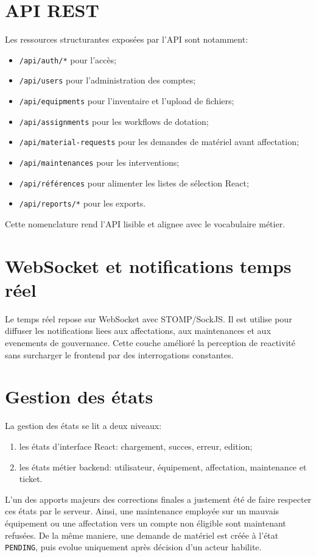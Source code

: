 ﻿\documentclass[12pt,a4paper,oneside]{report}
\begin{document}
\section{API REST}
Les ressources structurantes exposées par l'API sont notamment:
\begin{itemize}
  \item \texttt{/api/auth/*} pour l'accès;
  \item \texttt{/api/users} pour l'administration des comptes;
  \item \texttt{/api/equipments} pour l'inventaire et l'upload de fichiers;
  \item \texttt{/api/assignments} pour les workflows de dotation;
  \item \texttt{/api/material-requests} pour les demandes de matériel avant affectation;
  \item \texttt{/api/maintenances} pour les interventions;
  \item \texttt{/api/références} pour alimenter les listes de sélection React;
  \item \texttt{/api/reports/*} pour les exports.
\end{itemize}

Cette nomenclature rend l'API lisible et alignee avec le vocabulaire métier.

\section{WebSocket et notifications temps réel}
Le temps réel repose sur WebSocket avec STOMP/SockJS. Il est utilise pour diffuser les notifications liees aux affectations, aux maintenances et aux evenements de gouvernance. Cette couche amélioré la perception de reactivité sans surcharger le frontend par des interrogations constantes.

\section{Gestion des états}
La gestion des états se lit a deux niveaux:
\begin{enumerate}
  \item les états d'interface React: chargement, succes, erreur, edition;
  \item les états métier backend: utilisateur, équipement, affectation, maintenance et ticket.
\end{enumerate}

L'un des apports majeurs des corrections finales a justement été de faire respecter ces états par le serveur. Ainsi, une maintenance employée sur un mauvais équipement ou une affectation vers un compte non éligible sont maintenant refusées. De la même maniere, une demande de matériel est créée à l'état \texttt{PENDING}, puis evolue uniquement après décision d'un acteur habilite.
\end{document}
